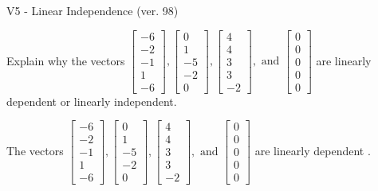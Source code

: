 \begin{exercise}
  \begin{exerciseTitle}V5 - Linear Independence (ver. 98)\end{exerciseTitle}
  \begin{exerciseStatement}
    Explain why the vectors \(\left[\begin{array}{r}
-6 \\
-2 \\
-1 \\
1 \\
-6
\end{array}\right] , \left[\begin{array}{r}
0 \\
1 \\
-5 \\
-2 \\
0
\end{array}\right] , \left[\begin{array}{r}
4 \\
4 \\
3 \\
3 \\
-2
\end{array}\right] , \text{ and } \left[\begin{array}{r}
0 \\
0 \\
0 \\
0 \\
0
\end{array}\right]\) are linearly dependent or linearly independent.	


  \end{exerciseStatement}
  \begin{exerciseAnswer}
   The vectors \(\left[\begin{array}{r}
-6 \\
-2 \\
-1 \\
1 \\
-6
\end{array}\right] , \left[\begin{array}{r}
0 \\
1 \\
-5 \\
-2 \\
0
\end{array}\right] , \left[\begin{array}{r}
4 \\
4 \\
3 \\
3 \\
-2
\end{array}\right] , \text{ and } \left[\begin{array}{r}
0 \\
0 \\
0 \\
0 \\
0
\end{array}\right]\) are 
  	 linearly dependent  .
  


  \end{exerciseAnswer}
\end{exercise}